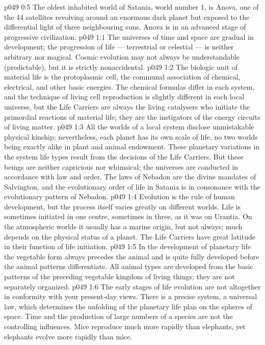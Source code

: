\vs p049 0:5 The oldest inhabited world of Satania, world number 1, is Anova, one of the 44 satellites revolving around an enormous dark planet but exposed to the differential light of three neighbouring suns. Anova is in an advanced stage of progressive civilization.
\vs p049 1:1 The universes of time and space are gradual in development; the progression of life --- terrestrial or celestial --- is neither arbitrary nor magical. Cosmic evolution may not always be understandable (predictable), but it is strictly nonaccidental.
\vs p049 1:2 The biologic unit of material life is the protoplasmic cell, the communal association of chemical, electrical, and other basic energies. The chemical formulas differ in each system, and the technique of living cell reproduction is slightly different in each local universe, but the Life Carriers are always the living catalysers who initiate the primordial reactions of material life; they are the instigators of the energy circuits of living matter.
\vs p049 1:3 All the worlds of a local system disclose unmistakable physical kinship; nevertheless, each planet has its own scale of life, no two worlds being exactly alike in plant and animal endowment. These planetary variations in the system life types result from the decisions of the Life Carriers. But these beings are neither capricious nor whimsical; the universes are conducted in accordance with law and order. The laws of Nebadon are the divine mandates of Salvington, and the evolutionary order of life in Satania is in consonance with the evolutionary pattern of Nebadon.
\vs p049 1:4 Evolution is the rule of human development, but the process itself varies greatly on different worlds. Life is sometimes initiated in one centre, sometimes in three, as it was on Urantia. On the atmospheric worlds it usually has a marine origin, but not always; much depends on the physical status of a planet. The Life Carriers have great latitude in their function of life initiation.
\vs p049 1:5 In the development of planetary life the vegetable form always precedes the animal and is quite fully developed before the animal patterns differentiate. All animal types are developed from the basic patterns of the preceding vegetable kingdom of living things; they are not separately organized.
\vs p049 1:6 The early stages of life evolution are not altogether in conformity with your present\hyp{}day views.  There is a precise system, a universal law, which determines the unfolding of the planetary life plan on the spheres of space. Time and the production of large numbers of a species are not the controlling influences. Mice reproduce much more rapidly than elephants, yet elephants evolve more rapidly than mice.
